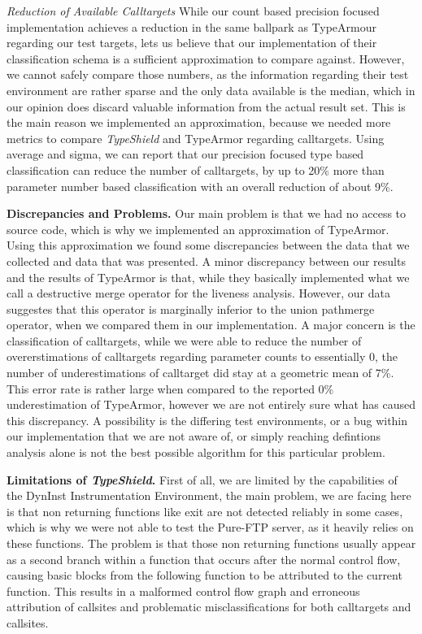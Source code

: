 \textit{Reduction of Available Calltargets}
While our count based precision focused implementation achieves a reduction in the same ballpark as
TypeArmour regarding our test targets, lets us believe that our implementation of their classification
schema is a sufficient approximation to compare against. However, we cannot safely compare those numbers,
as the information regarding their test environment are rather sparse and the only data available is the
median, which in our opinion does discard valuable information from the actual result set. This is the
main reason we implemented an approximation, because we needed more metrics to compare \textit{TypeShield}
and TypeArmor regarding calltargets. Using average and sigma, we can report that our precision focused
type based classification can reduce the number of calltargets, by up to 20\% more than parameter number
based classification with an overall reduction of about 9\%.


\textbf{Discrepancies and Problems.}
\label{section:discrep}
Our main problem is that we had no access to source code, which is why we implemented an approximation
of TypeArmor. Using this approximation we found some discrepancies between the data that we collected
and data that was presented.
A minor discrepancy between our results and the results of TypeArmor is that, while they basically implemented
what we call a destructive merge operator for the liveness analysis. However, our data suggestes that this
operator is marginally inferior to the union pathmerge operator, when we compared them in our implementation.
A major concern is the classification of calltargets, while we were able to reduce the number of overerstimations
of calltargets regarding parameter counts to essentially 0, the number of underestimations of calltarget did
stay at a geometric mean of 7\%. This error rate is rather large when compared to the reported 0\% underestimation
of TypeArmor, however we are not entirely sure what has caused this discrepancy. A possibility is the differing
test environments, or a bug within our implementation that we are not aware of, or simply reaching defintions
analysis alone is not the best possible algorithm for this particular problem.

\textbf{Limitations of \textit{TypeShield}.}
\label{section:limit}
First of all, we are limited by the capabilities of the DynInst Instrumentation Environment, the main problem,
we are facing here is that non returning functions like exit are not detected reliably in some cases, which is
why we were not able to test the Pure-FTP server, as it heavily relies on these functions. The problem is that
those non returning functions usually appear as a second branch within a function that occurs after the normal
control flow, causing basic blocks from the following function to be attributed to the current function. This
results in a malformed control flow graph and erroneous attribution of callsites and problematic misclassifications
for both calltargets and callsites.

